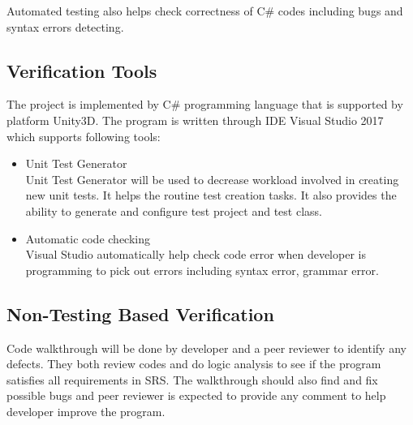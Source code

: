 \documentclass[12pt, titlepage]{article}
\begin{document}
	Automated testing also helps check correctness of C$\#$ codes including bugs and syntax errors detecting.
	
	\subsection{Verification Tools}
	
	The project is implemented by C$\#$ programming language that is supported by platform Unity3D. The program is written through IDE Visual Studio 2017 which supports following tools:
	
	\begin{itemize}
		\item Unit Test Generator\\
		
		Unit Test Generator will be used to decrease workload involved in creating new unit tests. It helps the routine test creation tasks. It also provides the ability to generate and configure test project and test class. 
		
	\end{itemize}
	
	\begin{itemize}
		\item Automatic code checking\\
		
		Visual Studio automatically help check code error when developer is programming to pick out errors including syntax error, grammar error. 	
	\end{itemize}
	
	
	\subsection{Non-Testing Based Verification}
	Code walkthrough will be done by developer and a peer reviewer to identify any
	defects. They both review codes and do logic analysis to see if the program
	satisfies all requirements in SRS. The walkthrough should also find and fix
	possible bugs and peer reviewer is expected to provide any comment to help
	developer improve the program.
	
\end{document}
